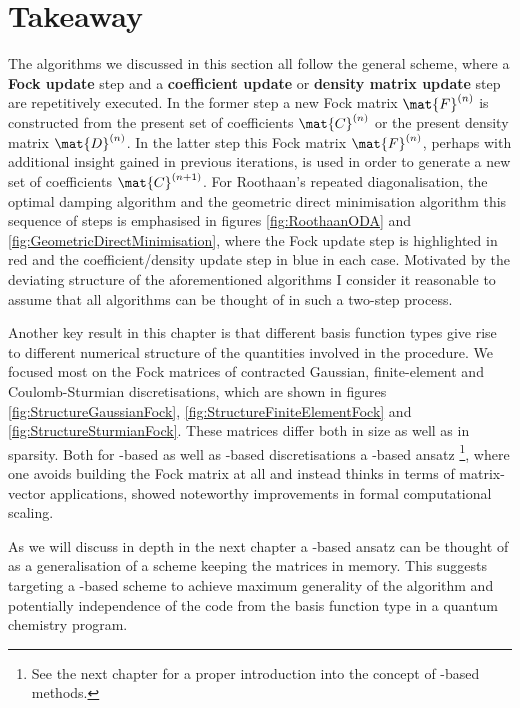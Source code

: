 \section{Takeaway}
The \SCF algorithms we discussed in this section all follow the general scheme,
where a \textbf{Fock update} step and
a \textbf{coefficient update} or \textbf{density matrix update}
step are repetitively executed.
In the former step a new Fock matrix $\mat{F}^{(n)}$ is constructed from
the present set of \SCF coefficients $\mat{C}^{(n)}$
or the present density matrix $\mat{D}^{(n)}$.
In the latter step this Fock matrix $\mat{F}^{(n)}$,
perhaps with additional insight gained in previous iterations,
is used in order to generate a new set of coefficients $\mat{C}^{(n+1)}$.
For Roothaan's repeated diagonalisation,
the optimal damping algorithm and the geometric direct minimisation algorithm
this sequence of steps is emphasised in figures
\vref{fig:RoothaanODA} and \vref{fig:GeometricDirectMinimisation},
where the Fock update step is highlighted in red
and the coefficient/density update step in blue in each case.
Motivated by the deviating structure of the aforementioned
algorithms I consider it reasonable
to assume that all \SCF algorithms can be thought of in such
a two-step process.

Another key result in this chapter is
that different basis function types give rise to
different numerical structure
of the quantities involved in the \SCF procedure.
We focused most on the Fock matrices
of contracted Gaussian, finite-element and Coulomb-Sturmian discretisations,
which are shown in figures
\vref{fig:StructureGaussianFock},
\vref{fig:StructureFiniteElementFock}
and \vref{fig:StructureSturmianFock}.
These matrices differ both in size as well as in sparsity.
Both for \FE-based as well as \CS-based
discretisations a \contraction-based ansatz%
\footnote{See the next chapter for a proper introduction into the concept
of \contraction-based methods.},
where one avoids building the Fock matrix at all
and instead thinks in terms of matrix-vector applications,
showed noteworthy improvements in formal computational scaling.

As we will discuss in depth in the next chapter
a \contraction-based ansatz can be thought of as a generalisation
of a scheme keeping the matrices in memory.
This suggests targeting a \contraction-based \SCF scheme to achieve
maximum generality of the \SCF algorithm
and potentially independence of the \SCF code from
the basis function type in a quantum chemistry program.

